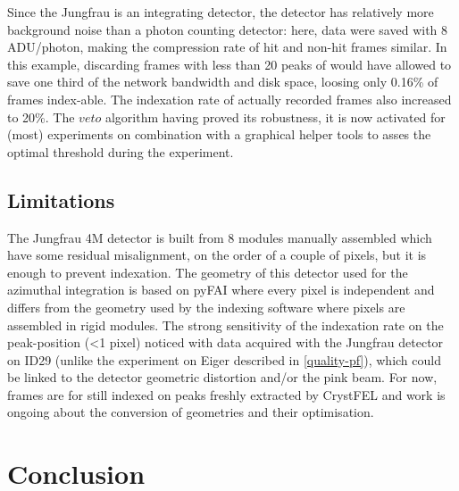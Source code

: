 \documentclass[preprint]{iucr}              %
\begin{document}

Since the Jungfrau is an integrating detector, the detector has relatively more background noise than a photon counting detector: here, data were saved with 8 ADU/photon, making the compression rate of hit and non-hit frames similar.
In this example, discarding frames with less than 20 peaks of would have allowed to save one third of the network bandwidth and disk space, loosing only 0.16\% of frames index-able. 
The indexation rate of actually recorded frames also increased to 20\%.
The $veto$ algorithm having proved its robustness, it is now activated for (most) experiments on combination with a graphical helper tools to asses the optimal threshold during the experiment.


\subsection{Limitations}
The Jungfrau 4M detector is built from 8 modules manually assembled which have some residual  misalignment, on the order of a couple of pixels, but it is enough to prevent indexation. 
The geometry of this detector used for the azimuthal integration is based on pyFAI where every pixel is independent and differs from the geometry used by the indexing software where pixels are assembled in rigid modules. 
The strong sensitivity of the indexation rate on the peak-position (<1 pixel) noticed with data acquired with the Jungfrau detector on ID29 (unlike the experiment on Eiger described in \ref{quality-pf}), which could be linked to the detector geometric distortion and/or the pink beam. 
For now, frames are for still indexed on peaks freshly extracted by CrystFEL and work is ongoing about the conversion of geometries and their optimisation.

\section{Conclusion}
\end{document}
